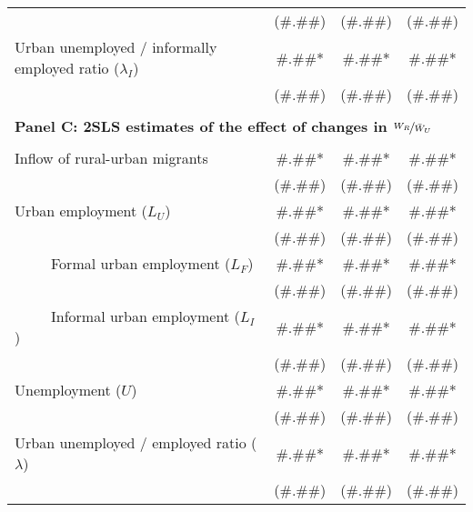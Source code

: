 \begin{tabular}{lrrr}
      & \multicolumn{1}{c}{(\#.\#\#)} & \multicolumn{1}{c}{(\#.\#\#)} & \multicolumn{1}{c}{(\#.\#\#)} \\
Urban unemployed / informally employed ratio ($\lambda_{I}$) & \multicolumn{1}{c}{\#.\#\#*} & \multicolumn{1}{c}{\#.\#\#*} & \multicolumn{1}{c}{\#.\#\#*} \\
      & \multicolumn{1}{c}{(\#.\#\#)} & \multicolumn{1}{c}{(\#.\#\#)} & \multicolumn{1}{c}{(\#.\#\#)} \\
      &       &       &  \\
\multicolumn{4}{l}{\boldmath{}\textbf{Panel C: 2SLS estimates of the effect of changes in $\nicefrac{W_{R}}{\bar{W}_{U}}$}\unboldmath{}} \\
      &       &       &  \\
Inflow of rural-urban migrants & \multicolumn{1}{c}{\#.\#\#*} & \multicolumn{1}{c}{\#.\#\#*} & \multicolumn{1}{c}{\#.\#\#*} \\
      & \multicolumn{1}{c}{(\#.\#\#)} & \multicolumn{1}{c}{(\#.\#\#)} & \multicolumn{1}{c}{(\#.\#\#)} \\
Urban employment ($L_{U}$) & \multicolumn{1}{c}{\#.\#\#*} & \multicolumn{1}{c}{\#.\#\#*} & \multicolumn{1}{c}{\#.\#\#*} \\
      & \multicolumn{1}{c}{(\#.\#\#)} & \multicolumn{1}{c}{(\#.\#\#)} & \multicolumn{1}{c}{(\#.\#\#)} \\
~~~~~Formal urban employment ($L_{F}$) & \multicolumn{1}{c}{\#.\#\#*} & \multicolumn{1}{c}{\#.\#\#*} & \multicolumn{1}{c}{\#.\#\#*} \\
      & \multicolumn{1}{c}{(\#.\#\#)} & \multicolumn{1}{c}{(\#.\#\#)} & \multicolumn{1}{c}{(\#.\#\#)} \\
~~~~~Informal urban employment ($L_{I}$) & \multicolumn{1}{c}{\#.\#\#*} & \multicolumn{1}{c}{\#.\#\#*} & \multicolumn{1}{c}{\#.\#\#*} \\
      & \multicolumn{1}{c}{(\#.\#\#)} & \multicolumn{1}{c}{(\#.\#\#)} & \multicolumn{1}{c}{(\#.\#\#)} \\
Unemployment ($U$) & \multicolumn{1}{c}{\#.\#\#*} & \multicolumn{1}{c}{\#.\#\#*} & \multicolumn{1}{c}{\#.\#\#*} \\
      & \multicolumn{1}{c}{(\#.\#\#)} & \multicolumn{1}{c}{(\#.\#\#)} & \multicolumn{1}{c}{(\#.\#\#)} \\
Urban unemployed / employed ratio ($\lambda$) & \multicolumn{1}{c}{\#.\#\#*} & \multicolumn{1}{c}{\#.\#\#*} & \multicolumn{1}{c}{\#.\#\#*} \\
      & \multicolumn{1}{c}{(\#.\#\#)} & \multicolumn{1}{c}{(\#.\#\#)} & \multicolumn{1}{c}{(\#.\#\#)} \\

\end{tabular}
